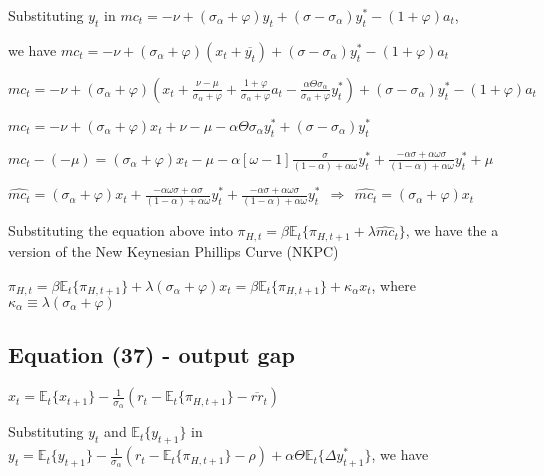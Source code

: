 \documentclass[
]{article}
\begin{document}
Substituting \(y_t\) in
\(mc_t = -\nu + (\sigma_\alpha+\varphi)y_t + (\sigma-\sigma_\alpha)y_t^*-(1+\varphi)a_t\),

we have
\(mc_t = -\nu + (\sigma_\alpha+\varphi)(x_t+\overline{y_t}) + (\sigma-\sigma_\alpha)y_t^*-(1+\varphi)a_t\)

\(\displaystyle mc_t = -\nu + (\sigma_\alpha+\varphi)\left(x_t+\frac{\nu -\mu}{\sigma_\alpha+\varphi} + \frac{1+\varphi}{\sigma_\alpha+\varphi}a_t - \frac{ \alpha \Theta \sigma_\alpha}{\sigma_\alpha+\varphi}y_t^* \right) + (\sigma-\sigma_\alpha)y_t^*-(1+\varphi)a_t\)

\(\displaystyle mc_t = -\nu + (\sigma_\alpha+\varphi)x_t + \nu - \mu - \alpha \Theta \sigma_\alpha y_t^* + (\sigma-\sigma_\alpha)y_t^*\)

\(\displaystyle mc_t-(-\mu)=(\sigma_\alpha+\varphi)x_t - \mu - \alpha \left[ \omega-1 \right] \frac{\sigma}{(1-\alpha)+\alpha \omega} y_t^* + \frac{-\alpha \sigma +\alpha \omega\sigma}{(1-\alpha)+\alpha \omega} y_t^* + \mu\)

\(\displaystyle \widehat{mc_t}=(\sigma_\alpha+\varphi)x_t + \frac{-\alpha \omega \sigma + \alpha \sigma}{(1-\alpha)+\alpha \omega} y_t^* + \frac{-\alpha \sigma +\alpha \omega\sigma}{(1-\alpha)+\alpha \omega} y_t^* \ \ \Rightarrow \ \ \widehat{mc_t}=(\sigma_\alpha+\varphi)x_t\)

Substituting the equation above into
\(\pi_{H,t} = \beta \mathbb{E}_t \{ \pi_{H,t+1} + \lambda \widehat{mc}_t\}\),
we have the a version of the New Keynesian Phillips Curve (NKPC)

\(\pi_{H,t} = \beta \mathbb{E}_t \{ \pi_{H,t+1}\} + \lambda (\sigma_\alpha+\varphi)x_t = \beta \mathbb{E}_t \{ \pi_{H,t+1}\} + \kappa_\alpha x_t\),
where \(\kappa_\alpha \equiv \lambda (\sigma_\alpha+\varphi)\)

\vspace{12pt}

\hypertarget{equation-37---output-gap}{%
\subsection{Equation (37) - output gap}\label{equation-37---output-gap}}

\(\displaystyle x_t = \mathbb{E}_t\{x_{t+1}\} -\frac{1}{\sigma_\alpha}(r_t-\mathbb{E}_t\{\pi_{H,t+1}\} -\overline{rr}_t)\)

\vspace{8pt}

Substituting \(y_t\) and \(\mathbb{E}_t\{y_{t+1}\}\) in
\(\displaystyle y_t= \mathbb{E}_t\{y_{t+1}\} -\frac{1}{\sigma_\alpha}(r_t-\mathbb{E}_t\{\pi_{H,t+1}\} -\rho)+ \alpha \Theta \mathbb{E}_t\{\Delta y_{t+1}^*\}\),
we have
\end{document}
